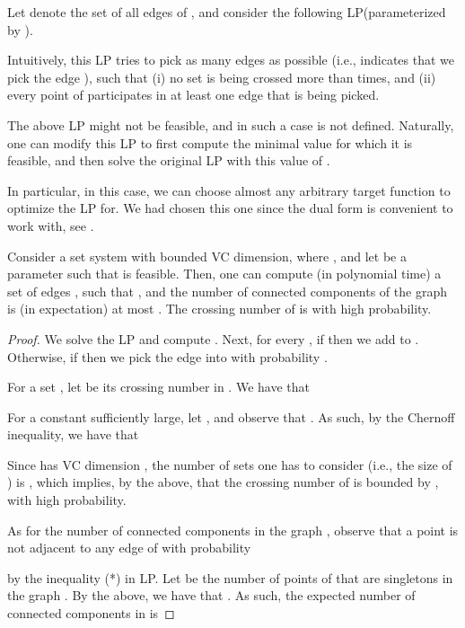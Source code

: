\documentclass[12pt]{article}
\newcommand{\Term}[1]{\textsf{#1}}
\newcommand{\LP}{\Term{L{}P}\xspace}
\newcommand{\VC}{\Term{V{C}}\xspace}
\begin{document}
\bigskip

Let  denote the set of all edges of , and
consider the following \LP (parameterized by ).


Intuitively, this \LP tries to pick as many edges as possible (i.e.,
 indicates that we pick the edge ),
such that (i) no set is being crossed more than  times, and (ii)
every point of  participates in at least one edge that is
being picked.

\begin{remark}
    The above \LP might not be feasible, and in such a case
     is not defined. Naturally, one can modify
    this \LP to first compute the minimal value  for which it is
    feasible, and then solve the original \LP with this value of .

    In particular, in this case, we can choose almost any arbitrary
    target function to optimize the \LP for. We had chosen this one
    since the dual form is convenient to work with, see
    .
\end{remark}

\begin{lemma}
    Consider a set system  with bounded \VC
    dimension, where , and let  be a
    parameter such that  is feasible. Then, one can
    compute (in polynomial time) a set of edges , such that
    , and the number of connected
    components of the graph  is (in expectation) at most
    .  The crossing number of  is  with high probability.

\end{lemma}
\begin{proof}
    We solve the \LP {} and compute . Next, for every , if
     then we add  to
    . Otherwise, if  then we pick the edge
     into  with probability .
    
    For a set , let  be its crossing number in
    .  We have that
    
    For a constant  sufficiently large, let ,
    and observe that . As
    such, by the Chernoff inequality, we have that
    
    Since  has \VC dimension , the number of sets one has to
    consider (i.e., the size of ) is 
    \cite{pa-cg-95}, which implies, by the above, that the crossing
    number of  is bounded by , with high probability.

    As for the number of connected components in the graph , observe that a point  is not adjacent to any
    edge of  with probability
    
    by the inequality (*) in \LP {}. Let  be the
    number of points of  that are singletons in the graph
    . By the above, we have that . As
    such, the expected number of connected components in 
    is
    
    \aftermathA
\end{proof}
\end{document}
